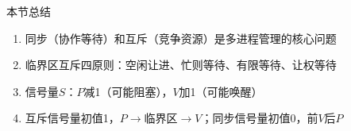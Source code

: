 \documentclass[10pt, aspectratio=169]{beamer}
\begin{document}
\begin{frame}{本节总结}
    \begin{enumerate}
        \item 同步（协作等待）和互斥（竞争资源）是多进程管理的核心问题
        \item 临界区互斥四原则：空闲让进、忙则等待、有限等待、让权等待
        \item 信号量$S$：$P$减1（可能阻塞），$V$加1（可能唤醒）
        \item 互斥信号量初值1，$P\to$临界区$\to V$；同步信号量初值0，前$V$后$P$
    \end{enumerate}
\end{frame}
\end{document}
